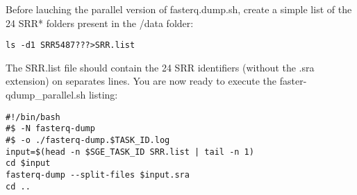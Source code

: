 Before lauching the parallel version of fasterq.dump.sh, create a simple list of the 24 SRR* folders present in the /data folder:

\begin{verbatim}
ls -d1 SRR5487???>SRR.list
\end{verbatim}

The SRR.list file should contain the 24 SRR identifiers (without the .sra extension) on separates lines. You are now ready to execute the faster-qdump\_parallel.sh listing:

\begin{verbatim}
#!/bin/bash
#$ -N fasterq-dump
#$ -o ./fasterq-dump.$TASK_ID.log
input=$(head -n $SGE_TASK_ID SRR.list | tail -n 1)
cd $input
fasterq-dump --split-files $input.sra
cd ..
\end{verbatim}












